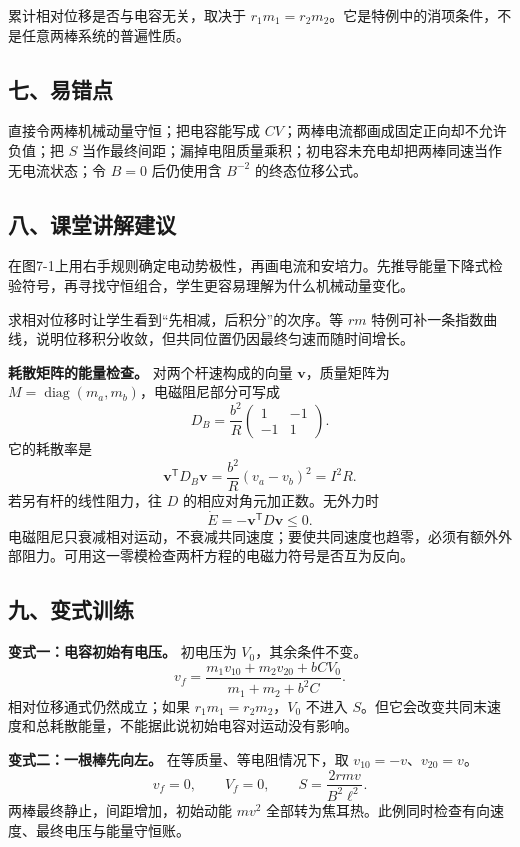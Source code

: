 \documentclass[12pt,a4paper,UTF8]{ctexart}
\begin{document}
累计相对位移是否与电容无关，取决于
\(r_1m_1=r_2m_2\)。它是特例中的消项条件，不是任意两棒系统的普遍性质。

\subsection{七、易错点}\label{ux4e03ux6613ux9519ux70b9-6}

直接令两棒机械动量守恒；把电容能写成
\(CV\)；两棒电流都画成固定正向却不允许负值；把 \(S\)
当作最终间距；漏掉电阻质量乘积；初电容未充电却把两棒同速当作无电流状态；令
\(B=0\) 后仍使用含 \(B^{-2}\) 的终态位移公式。

\subsection{八、课堂讲解建议}\label{ux516bux8bfeux5802ux8bb2ux89e3ux5efaux8bae-6}

在图7-1上用右手规则确定电动势极性，再画电流和安培力。先推导能量下降式检验符号，再寻找守恒组合，学生更容易理解为什么机械动量变化。

求相对位移时让学生看到``先相减，后积分''的次序。等 \(rm\)
特例可补一条指数曲线，说明位移积分收敛，但共同位置仍因最终匀速而随时间增长。

\textbf{耗散矩阵的能量检查。} 对两个杆速构成的向量
\(\boldsymbol v\)，质量矩阵为
\(M=\operatorname{diag}(m_a,m_b)\)，电磁阻尼部分可写成 \[
D_B=\frac{b^2}{R}
\begin{pmatrix}1&-1\\-1&1\end{pmatrix}.
\] 它的耗散率是 \[
\boldsymbol v^{\mathsf T}D_B\boldsymbol v
=\frac{b^2}{R}(v_a-v_b)^2=I^2R.
\] 若另有杆的线性阻力，往 \(D\) 的相应对角元加正数。无外力时 \[
\dot E=-\boldsymbol v^{\mathsf T}D\boldsymbol v\le0.
\]
电磁阻尼只衰减相对运动，不衰减共同速度；要使共同速度也趋零，必须有额外外部阻力。可用这一零模检查两杆方程的电磁力符号是否互为反向。

\subsection{九、变式训练}\label{ux4e5dux53d8ux5f0fux8badux7ec3-6}

\textbf{变式一：电容初始有电压。} 初电压为 \(V_0\)，其余条件不变。 \[
\boxed{v_f=
\frac{m_1v_{10}+m_2v_{20}+bCV_0}{m_1+m_2+b^2C}}.
\] 相对位移通式仍然成立；如果 \(r_1m_1=r_2m_2\)，\(V_0\) 不进入
\(S\)。但它会改变共同末速度和总耗散能量，不能据此说初始电容对运动没有影响。

\textbf{变式二：一根棒先向左。} 在等质量、等电阻情况下，取
\(v_{10}=-v\)、\(v_{20}=v\)。 \[
\boxed{v_f=0},\qquad\boxed{V_f=0},\qquad
\boxed{S=\frac{2rmv}{B^2\ell^2}}.
\] 两棒最终静止，间距增加，初始动能 \(mv^2\)
全部转为焦耳热。此例同时检查有向速度、最终电压与能量守恒账。
\end{document}
